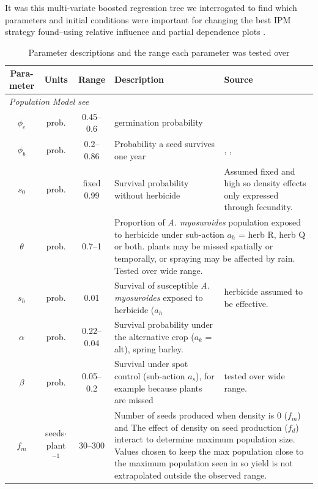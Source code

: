 \documentclass[12pt, a4paper]{article}
\begin{document}
It was this multi-variate boosted regression tree we interrogated to find which parameters and initial conditions were important for changing the best IPM strategy found--using relative influence and partial dependence plots \citep{Mill2016}.    

\begin{longtable}{c c c p{5cm} p{4cm}}
	\caption{Parameter descriptions and the range each parameter was tested over}
	\label{tab:pars}
	\\
	\hline
	\makecell{\textbf{Para-}\\\textbf{meter}} & \textbf{Units} & \textbf{Range} & \textbf{Description} & \textbf{Source} \\
	\hline
	\endhead
	\multicolumn{5}{l}{\textit{Population Model  see \nameref{app:pop_model}}}\\
	$\phi_e$ & prob. & 0.45--0.6 & germination probability & \citet{Colb2006} \\ 
	$\phi_b$ & prob. & 0.2--0.86 & Probability a seed survives one year & \citet{Colb2006}, \citet{Thom1997}, \citet{Cava1999}\\
	$s_0$ & prob. & fixed 0.99 & Survival probability without herbicide & Assumed fixed and high so density effects only expressed through fecundity.\\
	$\theta$ & prob. & 0.7--1 & \multicolumn{2}{l}{\parbox[t]{9cm}{Proportion of \textit{A. myosuroides} population exposed to herbicide under sub-action $a_h$ = herb R, herb Q or both. plants may be missed spatially or temporally, or spraying may be affected by rain. Tested over wide range.}} \\       
	$s_h$ & prob. & 0.01 & Survival of susceptible \textit{A. myosuroides} exposed to herbicide ($a_h$ & herbicide assumed to be effective.\\
	$\alpha$ & prob. & 0.22--0.04 & Survival probability under the alternative crop ($a_k$ = alt), spring barley. & \citet{Lutm2013}\\
	$\beta$ & prob. & 0.05--0.2 & Survival under spot control (sub-action $a_s$), for example because plants are missed & tested over wide range.\\
	$f_m$ & \makecell[t]{seeds$\cdot$\\plant$^{-1}$} & 30--300 & \multicolumn{2}{l}{\multirow{2}{9cm}{\parbox[t]{9cm}{Number of seeds produced when density is 0 ($f_m$) and The effect of density on seed production ($f_d$) interact to determine maximum population size. Values chosen to keep the max population close to the maximum population seen in \citet{Quee2011} so yield is not extrapolated outside the observed range.}}} \\

\end{longtable}
\end{document}
